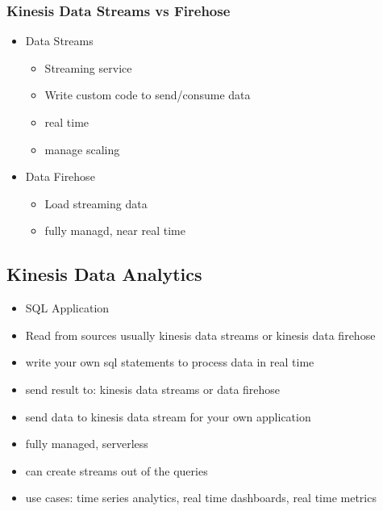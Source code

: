 \documentclass[]{scrartcl}
\begin{document}
\subsubsection{Kinesis Data Streams vs Firehose}
\begin{itemize}
	\item Data Streams
	\begin{itemize}
		\item Streaming service
		\item Write custom code to send/consume data
		\item real time
		\item manage scaling
	\end{itemize}
	\item Data Firehose
	\begin{itemize}
		\item Load streaming data
		\item fully managd, near real time
	\end{itemize}
\end{itemize}

\subsection{Kinesis Data Analytics}
\begin{itemize}
	\item SQL Application
	\item Read from sources usually kinesis data streams or kinesis data firehose
	\item write your own sql statements to process data in real time
	\item send result to: kinesis data streams or data firehose
	\item send data to kinesis data stream for your own application
	\item fully managed, serverless
	\item can create streams out of the queries
	\item use cases: time series analytics, real time dashboards, real time metrics
\end{itemize}
\end{document}
